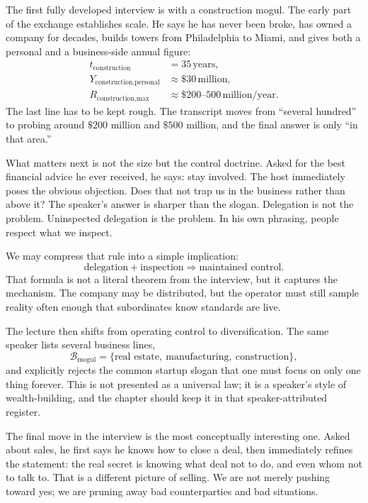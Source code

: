 The first fully developed interview is with a construction mogul. The early part of the exchange establishes scale. He says he has never been broke, has owned a company for decades, builds towers from Philadelphia to Miami, and gives both a personal and a business-side annual figure:
\begin{align}
t_{\text{construction}} &= 35\,\text{years},\\
Y_{\text{construction,personal}} &\approx \$30\,\text{million},\\
R_{\text{construction,max}} &\approx \$200\text{--}500\,\text{million/year}.
\end{align}
The last line has to be kept rough. The transcript moves from ``several hundred'' to probing around \(\$200\) million and \(\$500\) million, and the final answer is only ``in that area.''

What matters next is not the size but the control doctrine. Asked for the best financial advice he ever received, he says: stay involved. The host immediately poses the obvious objection. Does that not trap us in the business rather than above it? The speaker's answer is sharper than the slogan. Delegation is not the problem. Uninspected delegation is the problem. In his own phrasing, people respect what we inspect.

We may compress that rule into a simple implication:
\begin{equation}
\text{delegation} + \text{inspection} \Rightarrow \text{maintained control}.
\end{equation}
That formula is not a literal theorem from the interview, but it captures the mechanism. The company may be distributed, but the operator must still sample reality often enough that subordinates know standards are live.

The lecture then shifts from operating control to diversification. The same speaker lists several business lines,
\begin{equation}
\mathcal{B}_{\text{mogul}}=
\{\text{real estate},\ \text{manufacturing},\ \text{construction}\},
\end{equation}
and explicitly rejects the common startup slogan that one must focus on only one thing forever. This is not presented as a universal law; it is a speaker's style of wealth-building, and the chapter should keep it in that speaker-attributed register.

The final move in the interview is the most conceptually interesting one. Asked about sales, he first says he knows how to close a deal, then immediately refines the statement: the real secret is knowing what deal not to do, and even whom not to talk to. That is a different picture of selling. We are not merely pushing toward yes; we are pruning away bad counterparties and bad situations.

